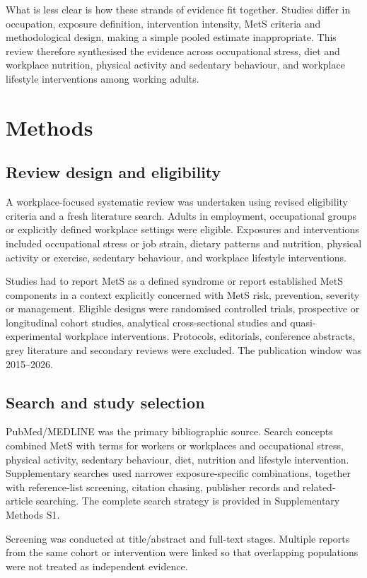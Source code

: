 \documentclass[11pt]{article}
\begin{document}
What is less clear is how these strands of evidence fit together. Studies differ in occupation, exposure definition, intervention intensity, MetS criteria and methodological design, making a simple pooled estimate inappropriate. This review therefore synthesised the evidence across occupational stress, diet and workplace nutrition, physical activity and sedentary behaviour, and workplace lifestyle interventions among working adults.

\section{Methods}

\subsection{Review design and eligibility}
A workplace-focused systematic review was undertaken using revised eligibility criteria and a fresh literature search. Adults in employment, occupational groups or explicitly defined workplace settings were eligible. Exposures and interventions included occupational stress or job strain, dietary patterns and nutrition, physical activity or exercise, sedentary behaviour, and workplace lifestyle interventions.

Studies had to report MetS as a defined syndrome or report established MetS components in a context explicitly concerned with MetS risk, prevention, severity or management. Eligible designs were randomised controlled trials, prospective or longitudinal cohort studies, analytical cross-sectional studies and quasi-experimental workplace interventions. Protocols, editorials, conference abstracts, grey literature and secondary reviews were excluded. The publication window was 2015--2026.

\subsection{Search and study selection}
PubMed/MEDLINE was the primary bibliographic source. Search concepts combined MetS with terms for workers or workplaces and occupational stress, physical activity, sedentary behaviour, diet, nutrition and lifestyle intervention. Supplementary searches used narrower exposure-specific combinations, together with reference-list screening, citation chasing, publisher records and related-article searching. The complete search strategy is provided in Supplementary Methods S1.

Screening was conducted at title/abstract and full-text stages. Multiple reports from the same cohort or intervention were linked so that overlapping populations were not treated as independent evidence.
\end{document}
